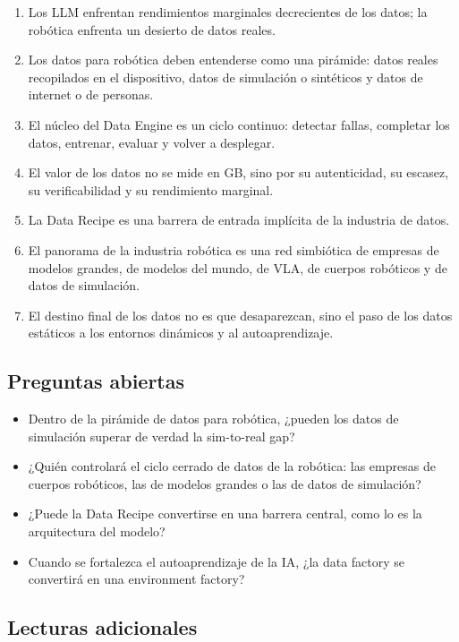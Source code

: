 \documentclass[a4paper]{article}
\begin{document}
\begin{enumerate}
\item Los LLM enfrentan rendimientos marginales decrecientes de los datos; la robótica enfrenta un desierto de datos reales.
\item Los datos para robótica deben entenderse como una pirámide: datos reales recopilados en el dispositivo, datos de simulación o sintéticos y datos de internet o de personas.
\item El núcleo del Data Engine es un ciclo continuo: detectar fallas, completar los datos, entrenar, evaluar y volver a desplegar.
\item El valor de los datos no se mide en GB, sino por su autenticidad, su escasez, su verificabilidad y su rendimiento marginal.
\item La Data Recipe es una barrera de entrada implícita de la industria de datos.
\item El panorama de la industria robótica es una red simbiótica de empresas de modelos grandes, de modelos del mundo, de VLA, de cuerpos robóticos y de datos de simulación.
\item El destino final de los datos no es que desaparezcan, sino el paso de los datos estáticos a los entornos dinámicos y al autoaprendizaje.
\end{enumerate}

\subsection{Preguntas abiertas}

\begin{itemize}
\item Dentro de la pirámide de datos para robótica, ¿pueden los datos de simulación superar de verdad la sim-to-real gap?
\item ¿Quién controlará el ciclo cerrado de datos de la robótica: las empresas de cuerpos robóticos, las de modelos grandes o las de datos de simulación?
\item ¿Puede la Data Recipe convertirse en una barrera central, como lo es la arquitectura del modelo?
\item Cuando se fortalezca el autoaprendizaje de la IA, ¿la data factory se convertirá en una environment factory?
\end{itemize}

\subsection{Lecturas adicionales}
\end{document}
